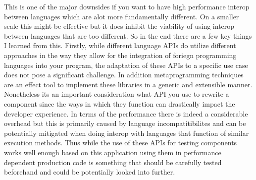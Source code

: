 {}This is one of the major downsides if you want to have high performance interop between languages which are alot more fundamentally different. On a smaller scale this might be effective but it does inhibit the viability of using interop between languages that are too different. \markdownRendererInterblockSeparator
{}\markdownRendererInterblockSeparator
{}So in the end there are a few key things I learned from this. Firstly, while different language APIs do utilize different approaches in the way they allow for the integration of foriegn programming languages into your program, the adaptation of these APIs to a specific use case does not pose a significant challenge. In addition metaprogramming techniques are an effect tool to implement these libraries in a generic and extensible manner. Nonetheless its an important consideration what API you use to rewrite a component since the ways in which they function can drastically impact the developer experience. \markdownRendererInterblockSeparator
{}In terms of the performance there is indeed a considerable overhead but this is primarily caused by language incompatitibilites and can be potentially mitigated when doing interop with languages that function of similar execution methods. Thus while the use of these APIs for testing components works well enough based on this application using them in performance dependent production code is something that should be carefully tested beforehand and could be potentially looked into further.\markdownRendererDocumentEnd